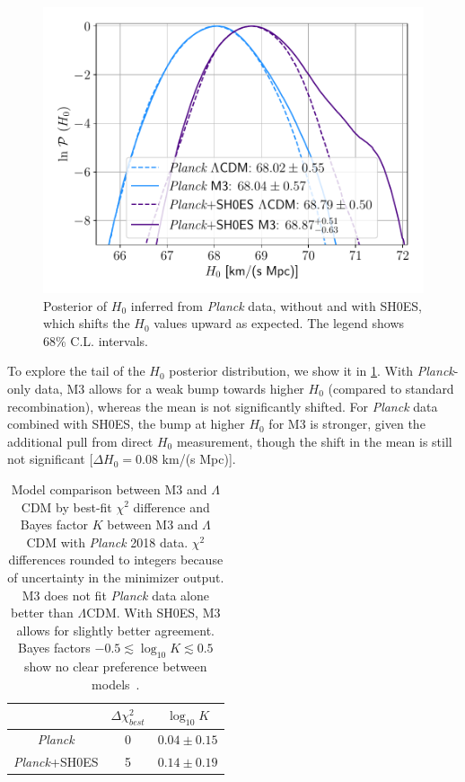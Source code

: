 \begin{figure}[ht!]
\includegraphics[width=\columnwidth]{img/H0-planck-1Dpost.pdf}
\caption[Posterior of $H_0$ inferred from {\it Planck} data]{Posterior of $H_0$ inferred from {\it Planck} data, without and with SH0ES, which shifts the $H_0$ values upward as expected.
The legend shows 68\% C.L. intervals.}
\label{fig:H0-planck}
\end{figure}

To explore the tail of the $H_0$ posterior distribution, we show it in \cref{fig:H0-planck}.
With {\it Planck}-only data, M3 allows for a weak bump towards higher $H_0$ (compared to standard recombination), whereas the mean is not significantly shifted.
For {\it Planck} data combined with SH0ES, the bump at higher $H_0$ for M3 is stronger, given the additional pull from direct $H_0$ measurement, though the shift in the mean is still not significant [$\Delta H_0=0.08$ km/(s Mpc)].

\begin{table}[ht!]
\centering
\begin{tabular}{|c|c|c|}
\hline
 & $\Delta \chi^2_{best}$ & $\log_{10} K$ \\
\hline
{\it Planck} & 0 & $0.04\pm 0.15$ \\
\hline
{\it Planck}+SH0ES & 5 & $0.14\pm 0.19$ \\
\hline
\end{tabular}
\caption[Comparison between the clumping and the standard model with {\it Planck} 2018 data]{Model comparison between M3 and $\Lambda$CDM by best-fit $\chi^2$ difference and Bayes factor $K$ between M3 and $\Lambda$CDM with {\it Planck} 2018 data.
$\chi^2$ differences rounded to integers because of uncertainty in the minimizer output.
M3 does not fit {\it Planck} data alone better than $\Lambda$CDM.
With SH0ES, M3 allows for slightly better agreement.
Bayes factors $-0.5\lesssim\log_{10}K\lesssim 0.5$ show no clear preference between models~\citep{bayes-factors}.}
\label{tab:model-comparison-current}
\end{table}

